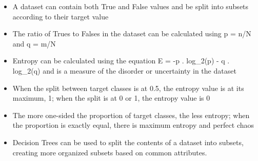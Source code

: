 \documentclass[11pt]{article}
\providecommand{\tightlist}{%
      \setlength{\itemsep}{0pt}\setlength{\parskip}{0pt}}
\begin{document}
\begin{itemize}
\tightlist
\item
  A dataset can contain both True and False values and be split into
  subsets according to their target value
\item
  The ratio of Trues to Falses in the dataset can be calculated using p
  = n/N and q = m/N
\item
  Entropy can be calculated using the equation E = -p . log\_2(p) - q .
  log\_2(q) and is a measure of the disorder or uncertainty in the
  dataset
\item
  When the split between target classes is at 0.5, the entropy value is
  at its maximum, 1; when the split is at 0 or 1, the entropy value is 0
\item
  The more one-sided the proportion of target classes, the less entropy;
  when the proportion is exactly equal, there is maximum entropy and
  perfect chaos
\item
  Decision Trees can be used to split the contents of a dataset into
  subsets, creating more organized subsets based on common attributes.
\end{itemize}
\end{document}
